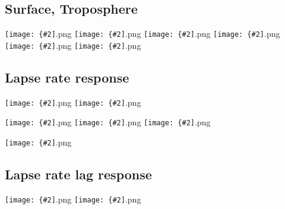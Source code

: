 \documentclass[12pt,a4paper]{article}
\newcommand{\pngfig}[2][0.5]{\texttt{[image: \{\#2]}.png}}
\begin{document}
\section{}

\subsection{Surface, Troposphere}
\pngfig[0.5]{comp_Tmax_sfc}
\pngfig[0.5]{comp_Tmin_sfc}
\pngfig[0.5]{comp_Tmax_700}
\pngfig[0.5]{comp_Tmin_700}
\pngfig[0.5]{comp_Tmax_300}
\pngfig[0.5]{comp_Tmin_300}

\subsection{Lapse rate response}
\pngfig[0.5]{regprof_TO_Zon_NH}
\pngfig[0.5]{comp_trop_zonal_profiles_m06}

\pngfig[0.5]{zonal_prof_land}
\pngfig[0.5]{zonal_prof_ocean}
\pngfig[0.5]{zonal_prof}


\pngfig[0.5]{cont_maxtemp_profile}

\subsection{Lapse rate lag response}

\pngfig[0.5]{3d_lag_lat15_30_v1}
\pngfig[0.5]{3d_lag_lat15_30_v2}
\end{document}
